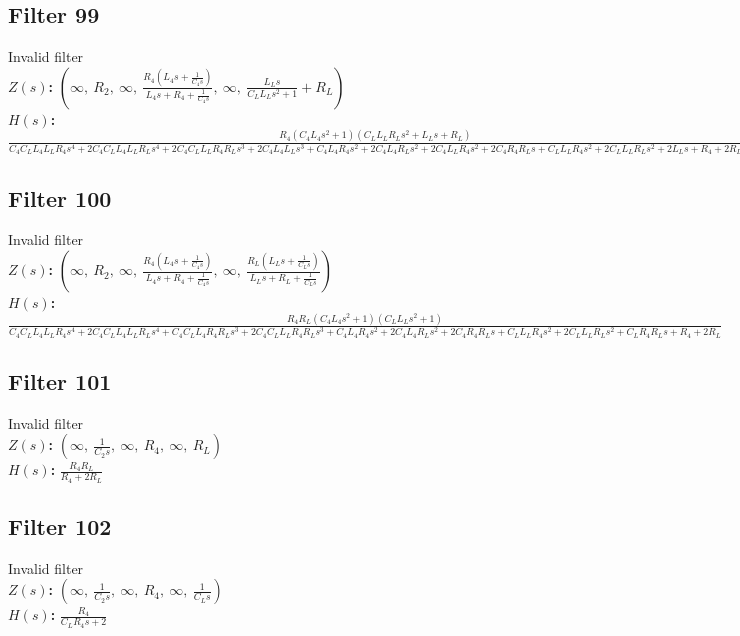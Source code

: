 \documentclass{article}
\begin{document}
\subsection*{Filter 99}
Invalid filter \\ 
\textbf{$Z(s)$:} $\left( \infty, \  R_{2}, \  \infty, \  \frac{R_{4} \left(L_{4} s + \frac{1}{C_{4} s}\right)}{L_{4} s + R_{4} + \frac{1}{C_{4} s}}, \  \infty, \  \frac{L_{L} s}{C_{L} L_{L} s^{2} + 1} + R_{L}\right)$ \\ 
\textbf{$H(s)$:} $\frac{R_{4} \left(C_{4} L_{4} s^{2} + 1\right) \left(C_{L} L_{L} R_{L} s^{2} + L_{L} s + R_{L}\right)}{C_{4} C_{L} L_{4} L_{L} R_{4} s^{4} + 2 C_{4} C_{L} L_{4} L_{L} R_{L} s^{4} + 2 C_{4} C_{L} L_{L} R_{4} R_{L} s^{3} + 2 C_{4} L_{4} L_{L} s^{3} + C_{4} L_{4} R_{4} s^{2} + 2 C_{4} L_{4} R_{L} s^{2} + 2 C_{4} L_{L} R_{4} s^{2} + 2 C_{4} R_{4} R_{L} s + C_{L} L_{L} R_{4} s^{2} + 2 C_{L} L_{L} R_{L} s^{2} + 2 L_{L} s + R_{4} + 2 R_{L}}$ \\ 
\subsection*{Filter 100}
Invalid filter \\ 
\textbf{$Z(s)$:} $\left( \infty, \  R_{2}, \  \infty, \  \frac{R_{4} \left(L_{4} s + \frac{1}{C_{4} s}\right)}{L_{4} s + R_{4} + \frac{1}{C_{4} s}}, \  \infty, \  \frac{R_{L} \left(L_{L} s + \frac{1}{C_{L} s}\right)}{L_{L} s + R_{L} + \frac{1}{C_{L} s}}\right)$ \\ 
\textbf{$H(s)$:} $\frac{R_{4} R_{L} \left(C_{4} L_{4} s^{2} + 1\right) \left(C_{L} L_{L} s^{2} + 1\right)}{C_{4} C_{L} L_{4} L_{L} R_{4} s^{4} + 2 C_{4} C_{L} L_{4} L_{L} R_{L} s^{4} + C_{4} C_{L} L_{4} R_{4} R_{L} s^{3} + 2 C_{4} C_{L} L_{L} R_{4} R_{L} s^{3} + C_{4} L_{4} R_{4} s^{2} + 2 C_{4} L_{4} R_{L} s^{2} + 2 C_{4} R_{4} R_{L} s + C_{L} L_{L} R_{4} s^{2} + 2 C_{L} L_{L} R_{L} s^{2} + C_{L} R_{4} R_{L} s + R_{4} + 2 R_{L}}$ \\ 
\subsection*{Filter 101}
Invalid filter \\ 
\textbf{$Z(s)$:} $\left( \infty, \  \frac{1}{C_{2} s}, \  \infty, \  R_{4}, \  \infty, \  R_{L}\right)$ \\ 
\textbf{$H(s)$:} $\frac{R_{4} R_{L}}{R_{4} + 2 R_{L}}$ \\ 
\subsection*{Filter 102}
Invalid filter \\ 
\textbf{$Z(s)$:} $\left( \infty, \  \frac{1}{C_{2} s}, \  \infty, \  R_{4}, \  \infty, \  \frac{1}{C_{L} s}\right)$ \\ 
\textbf{$H(s)$:} $\frac{R_{4}}{C_{L} R_{4} s + 2}$ \\ 
\end{document}
